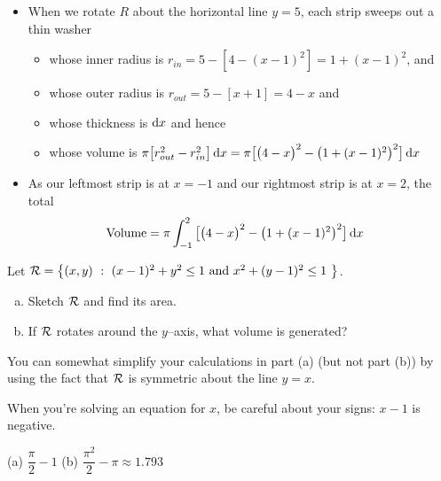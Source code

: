 \begin{solution}
\begin{itemize}
\item When we rotate $R$ about the horizontal line $y=5$,  each
strip  sweeps out a thin washer
\begin{itemize}
\item
whose inner radius is $r_{in}=5-[4-(x-1)^2]=1+(x-1)^2$, and
\item
whose outer radius is $r_{out}= 5-[x+1]=4-x$ and
\item
whose thickness is $\mathrm{d}x$ and hence
\item
whose volume is
$\pi\big[r_{out}^2-r_{in}^2\big]\,\mathrm{d}x
=\pi\big[{\big(4-x\big)}^2-{\big(1+(x-1)^2\big)}^2\big]\,\mathrm{d}x$

\end{itemize}
\item As our leftmost strip is at $x=-1$ and our rightmost
strip is at $x=2$, the total
\begin{align*}
{\rm Volume} &= \pi\int_{-1}^2
   \big[{\big(4-x\big)}^2-{\big(1+(x-1)^2\big)}^2\big]\,\mathrm{d}x
\end{align*}
\end{itemize}

\end{solution}


\begin{question}[M121 1999A]
 Let $\mathcal{R}=\big\{(x,y)\ :\ (x-1)^2+y^2\le 1\text{
and } x^2+(y-1)^2\le 1\ \big\}$.
\begin{enumerate}[(a)]
\item
Sketch $\mathcal{R}$ and find its area.
\item
 If $\mathcal{R}$ rotates around the $y$--axis, what volume is generated?
\end{enumerate}
\end{question}

\begin{hint}
You can somewhat simplify your calculations in part (a) (but not part (b)) by using the fact that $\mathcal{R}$ is symmetric about the line $y=x$.

When you're solving an equation for $x$, be careful about your signs: $x-1$ is negative.
\end{hint}

\begin{answer} (a)
$\dfrac{\pi}{2}-1$
\qquad(b)
$\dfrac{\pi^2}{2}-\pi\approx 1.793$
\end{answer}

